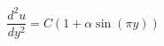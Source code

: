 \documentclass[preview,border=2pt]{standalone}
\begin{document}
\[
\frac{d^{2}u}{dy^{2}} = C\left(1+\alpha\sin(\pi y)\right)
\]
\end{document}
